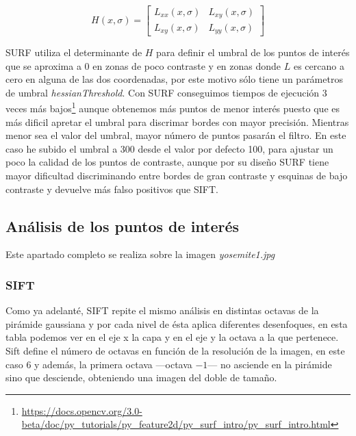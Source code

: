 \documentclass{article}
\newcommand{\img}[2]{
\noindent\makebox[\textwidth][c]{\texttt{[image: \#1]}}%
}
\begin{document}
\[ H(x,\sigma) =  \begin{bmatrix}
L_{xx}(x,\sigma) & L_{xy}(x,\sigma)\\ 
L_{xy}(x,\sigma) & L_{yy}(x,\sigma)
\end{bmatrix}\]

SURF utiliza el determinante de $H$ para definir el umbral de los puntos de interés que se aproxima a $0$ en zonas de poco contraste y en zonas donde $L$ es cercano a cero en alguna de las dos coordenadas, por este motivo sólo tiene un parámetros de umbral \textit{hessianThreshold}. Con SURF conseguimos tiempos de ejecución 3 veces más bajos\footnote{\url{https://docs.opencv.org/3.0-beta/doc/py_tutorials/py_feature2d/py_surf_intro/py_surf_intro.html}} aunque obtenemos más puntos de menor interés puesto que es más dificil apretar el umbral para discrimar bordes con mayor precisión. Mientras menor sea el valor del umbral, mayor número de puntos pasarán el filtro. En este caso he subido el umbral a 300 desde el valor por defecto 100, para ajustar un poco la calidad de los puntos de contraste, aunque por su diseño SURF tiene mayor dificultad discriminando entre bordes de gran contraste y esquinas de bajo contraste y devuelve más falso positivos que SIFT.

\subsection{Análisis de los puntos de interés}

Este apartado completo se realiza sobre la imagen \textit{yosemite1.jpg}

\img{img/yosemite1}{0.5}

\subsubsection{SIFT}

Como ya adelanté, SIFT repite el mismo análisis en distintas octavas de la pirámide gaussiana y por cada nivel de ésta aplica diferentes desenfoques, en esta tabla podemos ver en el eje x la capa y en el eje y la octava a la que pertenece. Sift define el número de octavas en función de la resolución de la imagen, en este caso 6 y además, la primera octava ---octava $-1$--- no asciende en la pirámide sino que desciende, obteniendo una imagen del doble de tamaño.
\\
\end{document}
